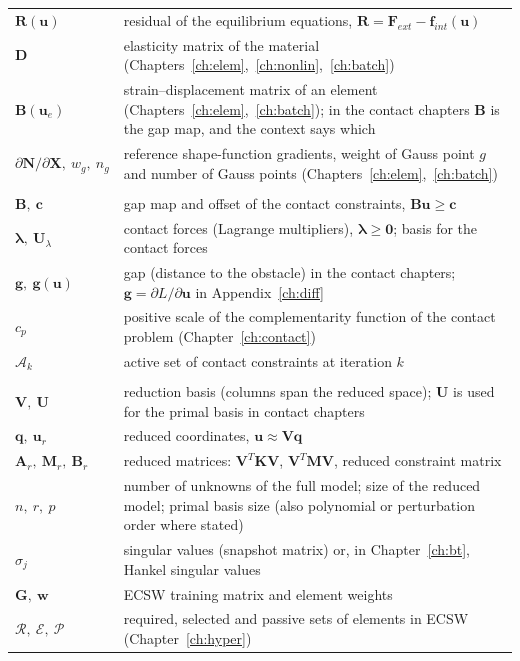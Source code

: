 \begin{longtable}{@{}>{\raggedright\arraybackslash}p{}>{\raggedright\arraybackslash}p{}@{}}
$\bm R(\bm u)$ & residual of the equilibrium equations, $\bm R=\bm F_{ext}-\bm f_{int}(\bm u)$ \\
$\bm D$ & elasticity matrix of the material (Chapters~\ref{ch:elem},~\ref{ch:nonlin},~\ref{ch:batch}) \\
$\bm B(\bm u_e)$ & strain--displacement matrix of an element (Chapters~\ref{ch:elem},~\ref{ch:batch}); in the contact chapters $\bm B$ is the gap map, and the context says which \\
$\partial\bm N/\partial\bm X,\ w_g,\ n_g$ & reference shape-function gradients, weight of Gauss point $g$ and number of Gauss points (Chapters~\ref{ch:elem},~\ref{ch:batch}) \\
\midrule
\multicolumn{2}{@{}l}{\emph{Contact}} \\
\midrule
$\bm B,\ \bm c$ & gap map and offset of the contact constraints, $\bm B\bm u\ge\bm c$ \\
$\bm\lambda,\ \bm U_\lambda$ & contact forces (Lagrange multipliers), $\bm\lambda\ge\bm 0$; basis for the contact forces \\
$\bm g,\ \bm g(\bm u)$ & gap (distance to the obstacle) in the contact chapters; $\bm g=\partial L/\partial\bm u$ in Appendix~\ref{ch:diff} \\
$c_p$ & positive scale of the complementarity function of the contact problem (Chapter~\ref{ch:contact}) \\
$\mathcal A_k$ & active set of contact constraints at iteration $k$ \\
\midrule
\multicolumn{2}{@{}l}{\emph{Reduction}} \\
\midrule
$\bm V,\ \bm U$ & reduction basis (columns span the reduced space); $\bm U$ is used for the primal basis in contact chapters \\
$\bm q,\ \bm u_r$ & reduced coordinates, $\bm u\approx\bm V\bm q$ \\
$\bm A_r,\ \bm M_r,\ \bm B_r$ & reduced matrices: $\bm V^T\bm K\bm V$, $\bm V^T\bm M\bm V$, reduced constraint matrix \\
$n,\ r,\ p$ & number of unknowns of the full model; size of the reduced model; primal basis size (also polynomial or perturbation order where stated) \\
$\sigma_j$ & singular values (snapshot matrix) or, in Chapter~\ref{ch:bt}, Hankel singular values \\
$\bm G,\ \bm w$ & ECSW training matrix and element weights \\
$\mathcal R,\ \mathcal E,\ \mathcal P$ & required, selected and passive sets of elements in ECSW (Chapter~\ref{ch:hyper}) \\

\end{longtable}
